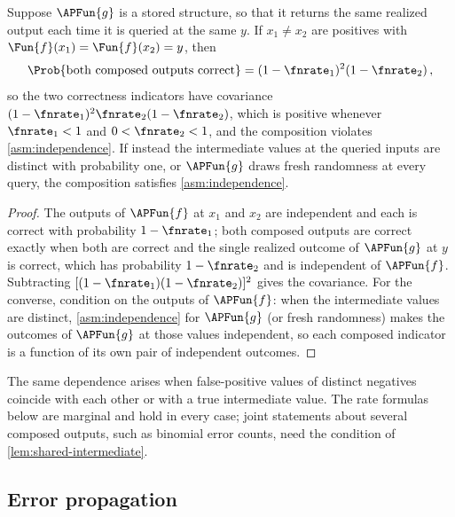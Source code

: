 \documentclass[ ../main.tex]{subfiles}
\begin{document}
\begin{lemma}
\label{lem:shared-intermediate}
Suppose $\APFun{g}$ is a stored structure, so that it returns the same
realized output each time it is queried at the same $y$.  If
$x_1 \neq x_2$ are positives with $\Fun{f}(x_1) = \Fun{f}(x_2) = y$, then
\begin{equation*}
\Prob{\text{both composed outputs correct}} = (1-\fnrate_1)^2(1-\fnrate_2)\,,
\end{equation*}
so the two correctness indicators have covariance
$(1-\fnrate_1)^2\fnrate_2(1-\fnrate_2)$, which is positive whenever
$\fnrate_1 < 1$ and $0 < \fnrate_2 < 1$, and the composition violates
\cref{asm:independence}.
If instead the intermediate values at the queried inputs are distinct with
probability one, or $\APFun{g}$ draws fresh randomness at every query, the
composition satisfies \cref{asm:independence}.
\end{lemma}
\begin{proof}
The outputs of $\APFun{f}$ at $x_1$ and $x_2$ are independent and each is
correct with probability $1-\fnrate_1$; both composed outputs are correct
exactly when both are correct and the single realized outcome of $\APFun{g}$
at $y$ is correct, which has probability $1-\fnrate_2$ and is independent of
$\APFun{f}$.  Subtracting $[(1-\fnrate_1)(1-\fnrate_2)]^2$ gives the
covariance.  For the converse, condition on the outputs of $\APFun{f}$: when
the intermediate values are distinct, \cref{asm:independence} for
$\APFun{g}$ (or fresh randomness) makes the outcomes of $\APFun{g}$ at those
values independent, so each composed indicator is a function of its own pair
of independent outcomes.
\end{proof}

\begin{remark}
The same dependence arises when false-positive values of distinct negatives
coincide with each other or with a true intermediate value.  The rate
formulas below are marginal and hold in every case; joint statements about
several composed outputs, such as binomial error counts, need the condition
of \cref{lem:shared-intermediate}.
\end{remark}

\subsection{Error propagation}
\label{sec:error-prop}
\end{document}

